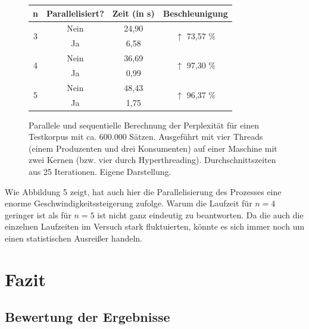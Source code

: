 \documentclass[a4paper,12pt]{scrartcl}
\begin{document}
    \begin{figure}[h]
        \centering
        \begin{tabular}{c|c||c|c}
            n & Parallelisiert? & Zeit (in s) & Beschleunigung \\
            \hline \hline
            \multirow{2}{*}{3} & \textcolor{BrickRed}{Nein} & 24,90 & \multirow{2}{*}{\textcolor{OliveGreen}{$\uparrow$ 73,57 \%}} \\
             & \textcolor{OliveGreen}{Ja} & 6,58 & \\
            \hline
            \multirow{2}{*}{4} & \textcolor{BrickRed}{Nein} & 36,69 & \multirow{2}{*}{\textcolor{OliveGreen}{$\uparrow$ 97,30 \%}} \\
             & \textcolor{OliveGreen}{Ja} & 0,99 & \\
            \hline 
            \multirow{2}{*}{5} & \textcolor{BrickRed}{Nein} & 48,43 & \multirow{2}{*}{\textcolor{OliveGreen}{$\uparrow$ 96,37 \%}} \\
             & \textcolor{OliveGreen}{Ja} & 1,75 & \\
        \end{tabular}
        \caption{Parallele und sequentielle Berechnung der Perplexität für einen Testkorpus mit ca. 600.000 Sätzen. Ausgeführt mit vier Threads (einem Produzenten und drei Konsumenten) auf einer Maschine mit zwei Kernen (bzw. vier durch Hyperthreading). Durchschnittszeiten aus 25 Iterationen. Eigene Darstellung.}
    \end{figure}

    Wie Abbildung 5 zeigt, hat auch hier die Parallelisierung des Prozesses eine enorme Geschwindigkeitssteigerung zufolge. Warum die Laufzeit für $n = 4$ geringer ist als für $n = 5$ ist nicht ganz eindeutig zu beantworten. Da die auch die einzelnen Laufzeiten im Versuch stark fluktuierten, könnte es sich immer noch um einen statistischen Ausreißer handeln.

\section{Fazit}

    \subsection{Bewertung der Ergebnisse}
\end{document}
